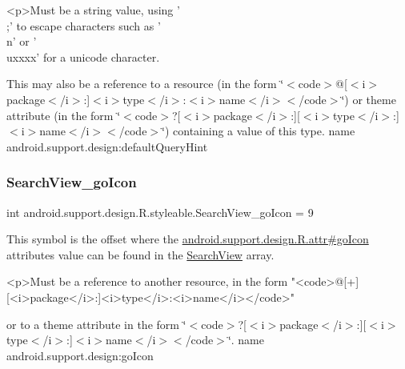 \begin{DoxyVerb}      <p>Must be a string value, using '\\;' to escape characters such as '\\n' or '\\uxxxx' for a unicode character.
\end{DoxyVerb}
 

This may also be a reference to a resource (in the form \char`\"{}$<$code$>$@\mbox{[}$<$i$>$package$<$/i$>$\+:\mbox{]}$<$i$>$type$<$/i$>$\+:$<$i$>$name$<$/i$>$$<$/code$>$\char`\"{}) or theme attribute (in the form \char`\"{}$<$code$>$?\mbox{[}$<$i$>$package$<$/i$>$\+:\mbox{]}\mbox{[}$<$i$>$type$<$/i$>$\+:\mbox{]}$<$i$>$name$<$/i$>$$<$/code$>$\char`\"{}) containing a value of this type.  name android.\+support.\+design\+:default\+Query\+Hint \mbox{\label{classandroid_1_1support_1_1design_1_1R_1_1styleable_a1ce6776217e2c2e3d29ecc0a70889b21}} 
\subsubsection{\texorpdfstring{Search\+View\+\_\+go\+Icon}{SearchView\_goIcon}}
{\footnotesize\ttfamily int android.\+support.\+design.\+R.\+styleable.\+Search\+View\+\_\+go\+Icon = 9\hspace{0.3cm}{\ttfamily [static]}}

This symbol is the offset where the \hyperlink{classandroid_1_1support_1_1design_1_1R_1_1attr_afe5121a9441846953200d55ba44308e6}{android.\+support.\+design.\+R.\+attr\#go\+Icon} attribute\textquotesingle{}s value can be found in the \hyperlink{classandroid_1_1support_1_1design_1_1R_1_1styleable_a8f7e72dc1bf854e14c1be7dbc1cb7392}{Search\+View} array.

\begin{DoxyVerb}      <p>Must be a reference to another resource, in the form "<code>@[+][<i>package</i>:]<i>type</i>:<i>name</i></code>"
\end{DoxyVerb}
 or to a theme attribute in the form \char`\"{}$<$code$>$?\mbox{[}$<$i$>$package$<$/i$>$\+:\mbox{]}\mbox{[}$<$i$>$type$<$/i$>$\+:\mbox{]}$<$i$>$name$<$/i$>$$<$/code$>$\char`\"{}.  name android.\+support.\+design\+:go\+Icon \mbox{\label{classandroid_1_1support_1_1design_1_1R_1_1styleable_a885ff4567a9e9b0a2f61d08d2b7e4a7d}} 
